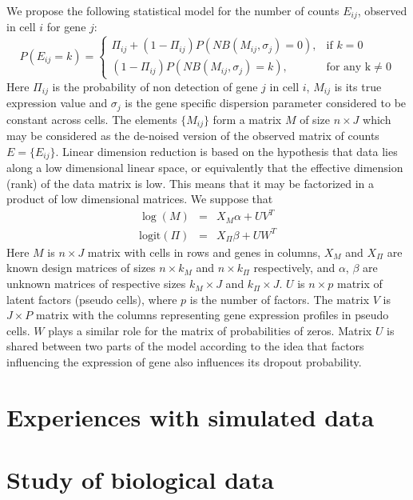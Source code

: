 \documentclass[12pt,a4paper]{article}
\begin{document}
We propose the following statistical model for the number of counts $E_{ij}$, observed in cell $i$ for gene $j$:
\begin{equation*}
P(E_{ij}=k)=\begin{cases}
\Pi_{ij}+(1-\Pi_{ij})P(NB(M_{ij},\sigma_j)=0), &\text{if } k=0\\
(1-\Pi_{ij})P(NB(M_{ij},\sigma_j)=k), & \text{for any k}\neq 0   
\end{cases}
\end{equation*}
Here $\Pi_{ij}$ is the probability of non detection of gene $j$ in cell $i$, $M_{ij}$ is its true expression value and $\sigma_j$ is the gene specific dispersion parameter considered to be constant across cells. The elements $\{M_{ij}\}$ form a matrix $M$ of size $n\times J$ which may be considered as the de-noised version of the observed matrix of counts $E=\{E_{ij}\}$. Linear dimension reduction is based on the hypothesis that data lies along a low dimensional linear space, or equivalently that the effective dimension (rank) of the data matrix is low. This means that it may be factorized in a product of low dimensional matrices. We suppose that     
\begin{eqnarray*}
\log(M)&=&X_M\alpha+UV^T\\
\text{logit}(\Pi)&=&X_\Pi\beta+UW^T
\end{eqnarray*}
Here $M$ is $n\times J$ matrix with cells in rows and genes in columns, $X_M$ and $X_\Pi$ are known design matrices of sizes $n\times k_M$ and $n\times k_\Pi$ respectively, and $\alpha$, $\beta$ are unknown matrices of respective sizes $k_M\times J$ and $k_\Pi\times J$. $U$ is $n\times p$ matrix of latent factors (pseudo cells), where $p$ is the number of factors. The matrix $V$ is $J\times P$ matrix with the columns representing gene expression profiles in pseudo cells. $W$ plays a similar role for the matrix of probabilities of zeros. Matrix $U$ is shared between two parts of the model according to the idea that factors influencing the expression of gene also influences its dropout probability. 
\section{Experiences with simulated data}

\section{Study of biological data}
\end{document}
